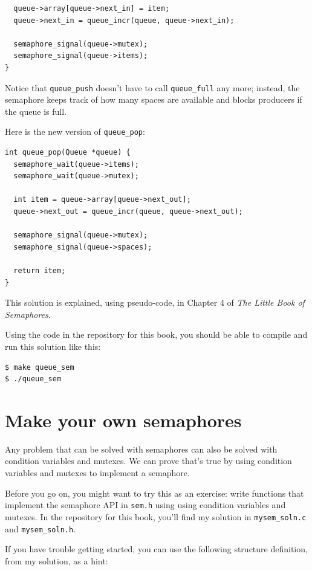 \documentclass[12pt]{book}
\begin{document}
{\begin{verbatim}
  queue->array[queue->next_in] = item;
  queue->next_in = queue_incr(queue, queue->next_in);

  semaphore_signal(queue->mutex);
  semaphore_signal(queue->items);
}
\end{verbatim}

Notice that \verb"queue_push" doesn't have to call
\verb"queue_full" any more; instead, the semaphore keeps track of
how many spaces are available and blocks producers if the queue
is full.

Here is the new version of \verb"queue_pop":

\begin{verbatim}
int queue_pop(Queue *queue) {
  semaphore_wait(queue->items);
  semaphore_wait(queue->mutex);
  
  int item = queue->array[queue->next_out];
  queue->next_out = queue_incr(queue, queue->next_out);

  semaphore_signal(queue->mutex);
  semaphore_signal(queue->spaces);

  return item;
}
\end{verbatim}

This solution is explained, using pseudo-code, in Chapter 4 of
{\it The Little Book of Semaphores}.

Using the code in the repository for this book, you should be able to compile and run this solution like this:

\begin{verbatim}
$ make queue_sem
$ ./queue_sem
\end{verbatim}



\section{Make your own semaphores}
\label{makeyourown}

Any problem that can be solved with semaphores can also be solved
with condition variables and mutexes.  We can prove that's true
by using condition variables and mutexes to implement a semaphore.

Before you go on, you might want to try this as an exercise: write
functions that implement the semaphore API in {\tt sem.h}
using using condition variables and mutexes.  In the repository for this book, you'll find my solution in \verb"mysem_soln.c" and
\verb"mysem_soln.h".

If you have trouble getting started, you can use the following
structure definition, from my solution, as a hint:

}
\end{document}
